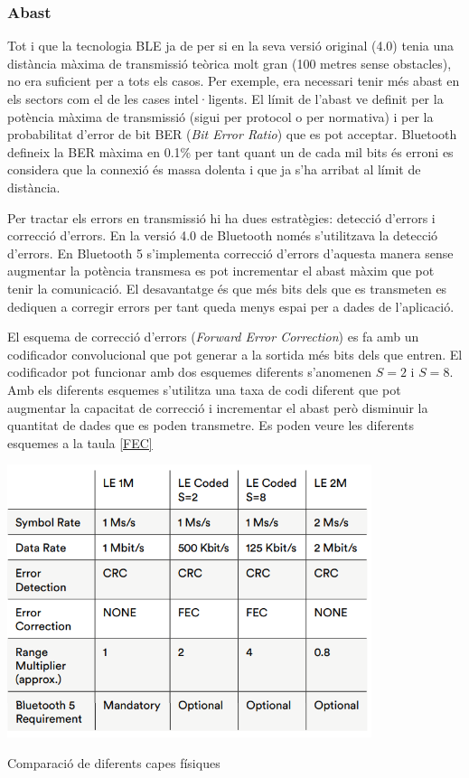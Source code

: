 \subsubsection{Abast}
Tot i que la tecnologia BLE ja de per si en la seva versió original (4.0) tenia una distància màxima de transmissió teòrica molt gran (100 metres sense obstacles), no era suficient per a tots els casos.
Per exemple, era necessari tenir més abast en els sectors com el de les cases intel·ligents.
El límit de l'abast ve definit per la potència màxima de transmissió (sigui per protocol o per normativa) i per la probabilitat d'error de bit BER (\textit{Bit Error Ratio}) que es pot acceptar.
Bluetooth defineix la BER màxima en 0.1\% per tant quant un de cada mil bits és erroni es considera que la connexió és massa dolenta i que ja s'ha arribat al límit de distància.

Per tractar els errors en transmissió hi ha dues estratègies: detecció d'errors i correcció d'errors.
En la versió 4.0 de Bluetooth només s'utilitzava la detecció d'errors.
En Bluetooth 5 s'implementa correcció d'errors d'aquesta manera sense augmentar la potència transmesa es pot incrementar el abast màxim que pot tenir la comunicació.
El desavantatge és que més bits dels que es transmeten es dediquen a corregir errors per tant queda menys espai per a dades de l'aplicació.


El esquema de correcció d'errors (\textit{Forward Error Correction}) es fa amb un codificador convolucional que pot generar a la sortida més bits dels que entren. El codificador pot funcionar amb dos esquemes diferents s'anomenen $S=2$ i $S=8$.
Amb els diferents esquemes s'utilitza una taxa de codi diferent que pot augmentar la capacitat de correcció i incrementar el abast però disminuir la quantitat de dades que es poden transmetre.
Es poden veure les diferents esquemes a la taula \ref{FEC} 

\begin{table}[htb]
	\begin{center}
		\includegraphics[width=0.8\textwidth]{./images/LE_PHY.png}
		\caption{Comparació de diferents capes físiques}
		\label{FEC}
	\end{center}
\end{table}

